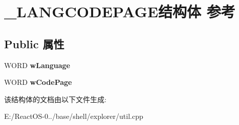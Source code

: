 \hypertarget{struct___l_a_n_g_c_o_d_e_p_a_g_e}{}\section{\+\_\+\+L\+A\+N\+G\+C\+O\+D\+E\+P\+A\+G\+E结构体 参考}
\label{struct___l_a_n_g_c_o_d_e_p_a_g_e}
\subsection*{Public 属性}
\begin{DoxyCompactItemize}
\item 
\mbox{\label{struct___l_a_n_g_c_o_d_e_p_a_g_e_afceaf0119e8e8f4ce3d8cfb15451dcfe}} 
W\+O\+RD {\bfseries w\+Language}
\item 
\mbox{\label{struct___l_a_n_g_c_o_d_e_p_a_g_e_a21a8355f1eec7bc11db28848687e88e1}} 
W\+O\+RD {\bfseries w\+Code\+Page}
\end{DoxyCompactItemize}


该结构体的文档由以下文件生成\+:\begin{DoxyCompactItemize}
\item 
E\+:/\+React\+O\+S-\/0../base/shell/explorer/util.\+cpp\end{DoxyCompactItemize}
